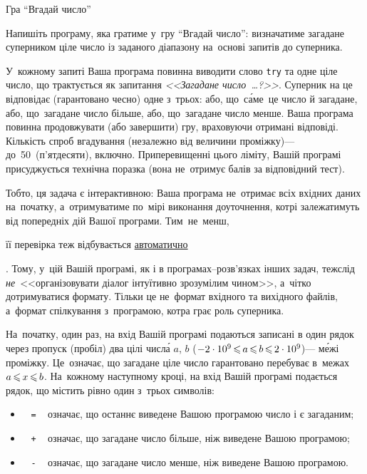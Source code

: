 ﻿\begin{problemAllDefault}{Гра ``Вгадай число''}

Напишіть програму, яка гратиме у~гру ``Вгадай число'': 
визначатиме загадане суперником ціле число із заданого діапазону
на~основі запитів до суперника. 

У~кожному запиті Ваша програма повинна виводити 
слово \texttt{try} та одне ціле число, 
що трактується як запитання \textsl{<<Загадане число~\dots?>>}.
Суперник на це відповідає (гарантовано чесно) одне з~трьох:
або, що~с\'{а}ме~це число й загадане,
або, що~загадане число більше,
або, що~загадане число менше.
Ваша програма повинна продовжувати (або завершити) гру, 
враховуючи отримані відповіді.
Кількість спроб вгадування (неза\-лежно від величини проміжку)\nolinebreak[3] --- 
до~50~(п'ятдесяти), включно.
При\nolinebreak[2] перевищенні цього ліміту, Вашій програмі присуджується технічна поразка
(вона не~отримує балів за відповідний тест).

Тобто, ця задача є інтерактивною: 
Ваша програма не~отримає всіх вхідних даних на~початку,
а~отримуватиме по~мірі виконання доуточ\-нення, 
котрі залежатимуть від попередніх дій Вашої програми. 
Тим~не~менш, \begin{slshape}її перевірка теж відбувається 
\underline{автоматично}\end{slshape}. 
Тому, у~цій Вашій програмі, як і в програмах--розв'язках інших задач, 
теж\nolinebreak[3] слід 
\emph{не}~<<організовувати діалог інтуїтивно зрозумілим чином>>,
а~чітко дотримуватися формату. Тільки це не~формат вхідного та вихідного файлів,
а~формат спілкування з~програмою, котра грає роль суперника.

\InputFile
На~початку, один раз, на вхід Вашій програмі подаються 
записані в один рядок через пропуск (пробіл) два цілі числ\'{а} $a$, $b$ 
($-2\cdot10^9\dib{{\<}}a\dib{{\<}}b\dib{{\<}}2\cdot10^9$)\nolinebreak[3] --- м\'{е}жі проміжку.
Це~означає, що загадане ціле число гарантовано перебуває в~межах 
$a\dib{{\<}}x\dib{{\<}}b$.
На~кожному наступному кроці, на вхід Вашій програмі подається 
рядок, що містить рівно один з~трьох символів:
\begin{itemize}
\item
~ \verb"=" ~ означає, що останнє виведене Вашою програмою число і є загаданим;
\item
~ \verb"+" ~ означає, що загадане число більше, ніж виведене Вашою програмою;
\item
~ \verb"-" ~ означає, що загадане число менше, ніж виведене Вашою програмою.
\end{itemize}


\end{problemAllDefault}
